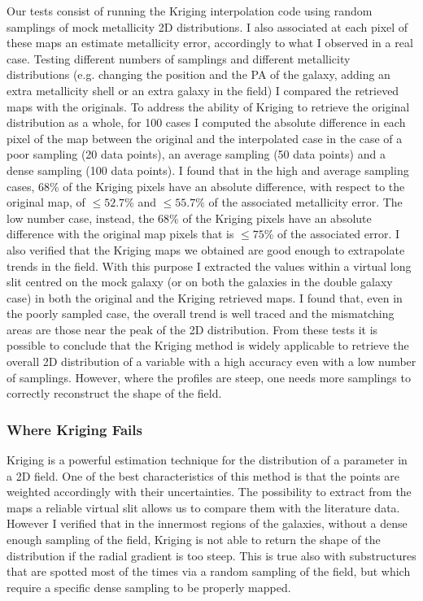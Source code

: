 	Our tests consist of running the Kriging interpolation code using random samplings of mock metallicity 2D 
	distributions. 
	I also associated at each pixel of these maps an estimate metallicity error, accordingly to what I observed in a real 
	case. 
	Testing different numbers of samplings and different metallicity distributions (e.g. changing the position and the PA of the 
	galaxy, adding an extra metallicity shell or an extra galaxy in the field) I compared the retrieved maps with the 
	originals. 
	To address the ability of Kriging to retrieve the original distribution as a whole, for 100 cases I computed the absolute 
	difference in each pixel of the map between the original and the interpolated case in the case of a poor sampling (20 
	data points), an average sampling (50 data points) and a dense sampling (100 data points). 
	I found that in the high and average sampling cases, 68\% of the Kriging pixels have an absolute difference, with respect to 
	the original map, of $\leq 52.7$\% and $\leq 55.7$\% of the associated metallicity error. 
	The low number case, instead, the 68\% of the Kriging pixels have an absolute difference with the original map pixels 
	that is $\leq 75$\% of the associated error. 
	I also verified that the Kriging maps we obtained are good enough to extrapolate trends in the field. 
	With this purpose I extracted the values within a virtual long slit centred on the mock galaxy (or on both the galaxies in 
	the double galaxy case) in both the original and the Kriging retrieved maps. 
	I found that, even in the poorly sampled case, the overall trend is well traced and the mismatching areas are those 
	near the peak of the 2D distribution. 
	From these tests it is possible to conclude that the Kriging method is widely applicable to retrieve the overall 2D 
	distribution of a variable with a high accuracy even with a low number of samplings. 
	However, where the profiles are steep, one needs more samplings to correctly reconstruct the shape of the 
	field. 
	
	
	\subsubsection{Where Kriging Fails}
	Kriging is a powerful estimation technique for the distribution of a parameter in a 2D field. 
	One of the best characteristics of this method is that the points are weighted accordingly with their uncertainties. 
	The possibility to extract from the maps a reliable virtual slit allows us to compare them with the literature data.
	However I verified that in the innermost regions of the galaxies, without a dense enough sampling of the field, 
	Kriging is not able to return the shape of the distribution if the radial gradient is too steep. 
	This is true also with substructures that are spotted most of the times via a random sampling of the field, but which 
	require a specific dense sampling to be properly mapped. 
	
